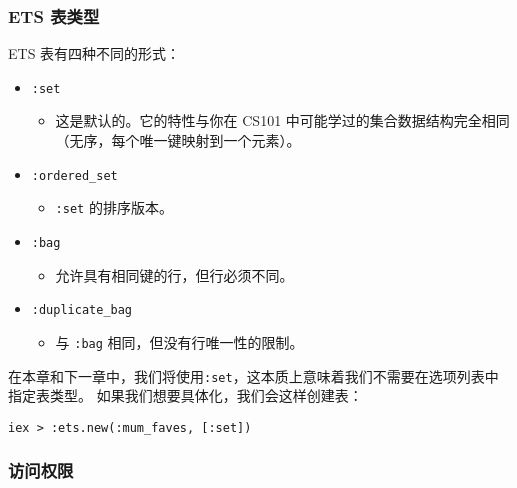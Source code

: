\subsubsection{ETS 表类型}

ETS 表有四种不同的形式：

\begin{itemize}

\item  \texttt{:set}

  \begin{itemize}
  
  \item
    这是默认的。它的特性与你在 CS101
    中可能学过的集合数据结构完全相同（无序，每个唯一键映射到一个元素）。
  \end{itemize}
\item  \texttt{:ordered\_set}

  \begin{itemize}
  
  \item    \texttt{:set} 的排序版本。
  \end{itemize}
\item  \texttt{:bag}

  \begin{itemize}
  
  \item    允许具有相同键的行，但行必须不同。
  \end{itemize}
\item  \texttt{:duplicate\_bag}

  \begin{itemize}
  
  \item    与 \texttt{:bag} 相同，但没有行唯一性的限制。
  \end{itemize}
\end{itemize}

在本章和下一章中，我们将使用\texttt{:set}，这本质上意味着我们不需要在选项列表中指定表类型。
如果我们想要具体化，我们会这样创建表：

\begin{code}{}
\begin{verbatim}
iex > :ets.new(:mum_faves, [:set])
\end{verbatim}
\end{code}


\subsubsection{访问权限}

